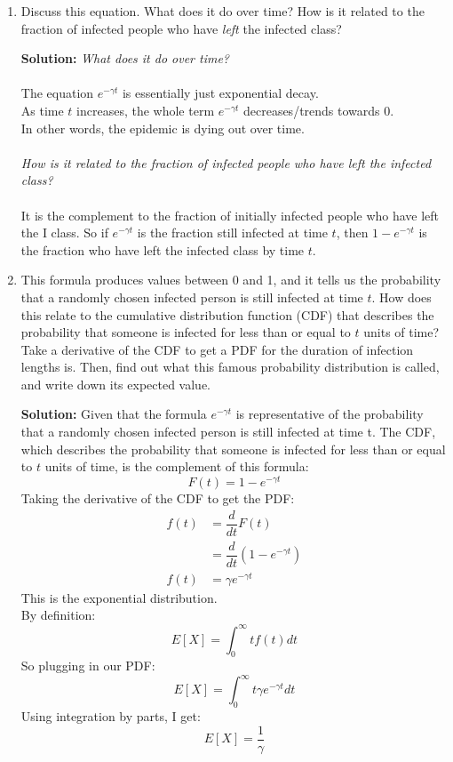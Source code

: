 \documentclass[11pt]{article}
\newenvironment{solution}{\par\noindent\begingroup\color{BrickRed}\textbf{Solution:} }{\par\endgroup}
\begin{document}
\begin{enumerate}
\begin{enumerate}[label=\alph*.]
	\item Discuss this equation. 
		  What does it do over time?
		  How is it related to the fraction of infected people who have {\it left} the infected class?
		\begin{solution} \newline \newline
			\textit{What does it do over time?} \\ \\
				The equation $e^{-\gamma t}$ is essentially just exponential decay. \\
				As time $t$ increases, the whole term $e^{-\gamma t}$ decreases/trends towards $0$. \\
				In other words, the epidemic is dying out over time. \\ \\
			\textit{How is it related to the fraction of infected people who have left the infected class?} \\ \\
				It is the complement to the fraction of initially infected people who have left the I class.
				So if $e^{-\gamma t}$ is the fraction still infected at time $t$, then
				$1 - e^{-\gamma t}$ is the fraction who have left the infected class by time $t$.
		\end{solution}
			
	\item This formula produces values between 0 and 1,
		  and it tells us the probability that a randomly chosen infected person is still infected at time $t$.
		  How does this relate to the cumulative distribution function (CDF) 
		  that describes the probability that someone is infected for less than or equal to $t$ units of time? 
		  Take a derivative of the CDF to get a PDF for the duration of infection lengths is. 
		  Then, find out what this famous probability distribution is called, and write down its expected value.
		\begin{solution} \newline \newline
			Given that the formula $e^{-\gamma t}$ is representative of the probability that a randomly chosen infected person is still infected at time t.
			The CDF, which describes the probability that someone is infected for less than or equal to $t$ units of time, is the complement of this formula:
			$$F(t) = 1 - e^{-\gamma t}$$
			Taking the derivative of the CDF to get the PDF:
			\begin{align*}
			f(t) &= \dfrac{d}{dt} F(t) \\
				 &= \dfrac{d}{dt} (1 - e^{-\gamma t}) \\
			f(t) &= \gamma e^{-\gamma t}
			\end{align*}
			This is the exponential distribution. \\
			By definition:
			$$E[X] = \int_0^\infty t f(t) dt$$
			So plugging in our PDF:
			$$E[X] = \int_0^\infty t \gamma e^{-\gamma t} dt$$
			Using integration by parts, I get:
			$$E[X] = \frac{1}{\gamma}$$
		\end{solution}


\end{enumerate}
\end{enumerate}
\end{document}
